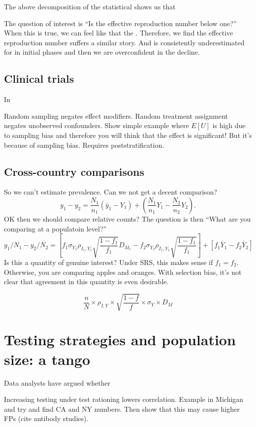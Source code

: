 \documentclass[11pt]{article}
\numberwithin{equation}{section}
\theoremstyle{plain}
\begin{document}
The above decomposition of the statistical shows us that

The question of interest is ``Is the effective reproduction number below one?'' When this is true, we can feel like that the .
Therefore, we find the effective reproduction number suffers a similar story. And is consistently underestimated for in initial phases and then we are overconfident in the decline.

\subsection{Clinical trials}

In

Random sampling negates effect modifiers.  Random treatment assignment negates unobserved confounders.  Show simple example where $E[U]$ is high due to sampling bias and therefore you will think that the effect is significant! But it's because of sampling bias. Requires poststratification.

\subsection{Cross-country comparisons}

So we can't estimate prevalence.  Can we not get a decent comparison?
$$
y_1 - y_2 = \frac{N_1}{n_1} ( \bar y_1 - Y_{1}) + \left( \frac{N_1}{n_1} Y_{1} - \frac{N_2}{n_2} Y_2  \right).
$$
OK then we should compare relative counts?
The question is then ``What are you comparing at a populatoin level?''
$$
y_1/N_1 - y_2/ N_2 = \left[ f_1 \sigma_{Y_1} \rho_{I_1, Y_1} \sqrt{\frac{1-f_1}{f_1}} D_{M_1} - f_2 \sigma_{Y_2} \rho_{I_1, Y_1} \sqrt{\frac{1-f_1}{f_1}}  \right] + \left[ f_1 \bar Y_1 - f_2 \bar Y_2 \right]
$$
Is this a quantity of genuine interest? Under SRS, this makes sense if $f_1 = f_2$.  Otherwise, you are comparing apples and oranges.  With selection bias, it's not clear that agreement in this quantity is even desirable.

$$
\frac{n}{N} \times \rho_{I,Y} \times \sqrt{\frac{1-f}{f}} \times \sigma_{Y} \times D_M
$$

\section{Testing strategies and population size: a tango}

Data analysts have argued whether

Increasing testing under test rationing lowers correlation.  Example in Michigan and try and find CA and NY numbers.  Then show that this may cause higher FPs (cite antibody studies).
\end{document}
